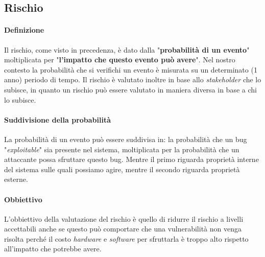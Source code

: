     \subsection{Rischio}
        \paragraph{Definizione} Il rischio, come visto in precedenza, è dato dalla "\textbf{probabilità di un evento}" moltiplicata per "\textbf{l'impatto che questo evento può avere}". Nel nostro contesto la probabilità che si verifichi un evento è misurata su un determinato (1 anno) periodo di tempo. Il rischio è valutato inoltre in base allo \textit{stakeholder} che lo subisce, in quanto un rischio può essere valutato in maniera diversa in base a chi lo subisce.
        \paragraph{Suddivisione della probabilità} La probabilità di un evento può essere suddivisa in: la probabilità che un bug "\textit{exploitable}" sia presente nel sistema, moltiplicata per la probabilità che un attaccante possa sfruttare questo bug. Mentre il primo riguarda proprietà interne del sistema sulle quali possiamo agire, mentre il secondo riguarda proprietà esterne.
        \paragraph{Obbiettivo} L'obbiettivo della valutazione del rischio è quello di ridurre il rischio a livelli accettabili anche se questo può comportare che una vulnerabilità non venga risolta perché il costo \textit{hardware} e \textit{software} per sfruttarla è troppo alto rispetto all'impatto che potrebbe avere.